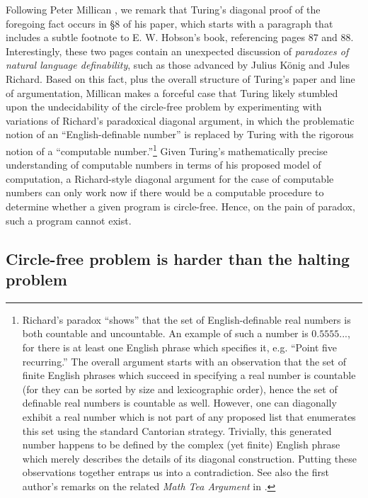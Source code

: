 \documentclass{amsart}
\begin{document}
Following Peter Millican \cite{millican2021turing}, we remark that Turing's diagonal proof of the foregoing fact occurs in §8 of his paper, which starts with a paragraph that includes a subtle footnote to E. W. Hobson's \cite{hobson1921theory} book, referencing pages 87 and 88. Interestingly, these two pages contain an unexpected discussion of \textit{paradoxes of natural language definability}, such as those advanced by Julius König and Jules Richard. Based on this fact, plus the overall structure of Turing's paper and line of argumentation, Millican makes a forceful case that Turing likely stumbled upon the undecidability of the circle-free problem by experimenting with variations of Richard's paradoxical diagonal argument, in which the problematic notion of an \enquote{English-definable number} is replaced by Turing with the rigorous notion of a \enquote{computable number.}\footnote{Richard's paradox \enquote{shows} that the set of English-definable real numbers is both countable and uncountable. An example of such a number is $0.5555...$, for there is at least one English phrase which specifies it, e.g. \enquote{Point five recurring.} The overall argument starts with an observation that the set of finite English phrases which succeed in specifying a real number is countable (for they can be sorted by size and lexicographic order), hence the set of definable real numbers is countable as well. However, one can diagonally exhibit a real number which is not part of any proposed list that enumerates this set using the standard Cantorian strategy. Trivially, this generated number happens to be defined by the complex (yet finite) English phrase which merely describes the details of its diagonal construction. Putting these observations together entraps us into a contradiction. See also the first author's remarks on the related \emph{Math Tea Argument} in \cite{HamkinsLinetskyReitz2013:PointwiseDefinableModelsOfSetTheory}.} Given Turing's mathematically precise understanding of computable numbers in terms of his proposed model of computation, a Richard-style diagonal argument for the case of computable numbers can only work now if there would be a computable procedure to determine whether a given program is circle-free. 
Hence, on the pain of paradox, such a program cannot exist.\goodbreak

\subsection{Circle-free problem is harder than the halting problem}
\end{document}
